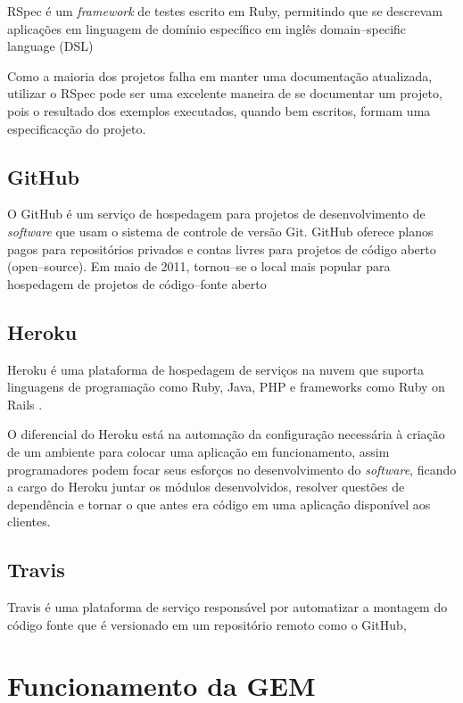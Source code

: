 RSpec \'e um \emph{framework} de testes escrito em Ruby, permitindo que se descrevam aplica\c{c}\~oes em linguagem de dom\'inio espec\'ifico em ingl\^es domain--specific language (DSL) \cite{chelimsky2010rspec}

Como a maioria dos projetos falha em manter uma documenta\c{c}\~ao atualizada, utilizar o RSpec pode ser uma excelente maneira de se documentar um projeto, pois o resultado dos exemplos executados, quando bem escritos, formam uma especificac\c{c}\~ao do projeto.

\subsection{GitHub}

O GitHub \'e um servi\c{c}o de hospedagem para projetos de desenvolvimento de \emph{software} que usam o sistema de controle de vers\~ao Git. GitHub oferece planos pagos para reposit\'orios privados e contas livres para projetos de c\'odigo aberto (open--source). Em maio de 2011, tornou--se o local mais popular para hospedagem de projetos de c\'odigo--fonte aberto \cite{loeliger2012version}

\subsection{Heroku}

Heroku \'e uma plataforma de hospedagem de servi\c{c}os na nuvem que suporta linguagens de programa\c{c}\~ao como Ruby, Java, PHP e frameworks como Ruby on Rails \cite{kemp2013professional}.

O diferencial do Heroku est\'a na automa\c{c}\~ao da configura\c{c}\~ao necess\'aria \`a cria\c{c}\~ao de um ambiente para colocar uma aplica\c{c}\~ao em funcionamento, assim programadores podem focar seus esfor\c{c}os no desenvolvimento do \emph{software}, ficando a cargo do Heroku juntar os m\'odulos desenvolvidos, resolver quest\~oes de depend\^encia e tornar o que antes era c\'odigo em uma aplica\c{c}\~ao dispon\'ivel aos clientes.

\subsection{Travis}

Travis \'e uma plataforma de servi\c{c}o respons\'avel por automatizar a montagem do c\'odigo fonte que \'e versionado em um reposit\'orio remoto como o GitHub, 

\section{Funcionamento da GEM}

